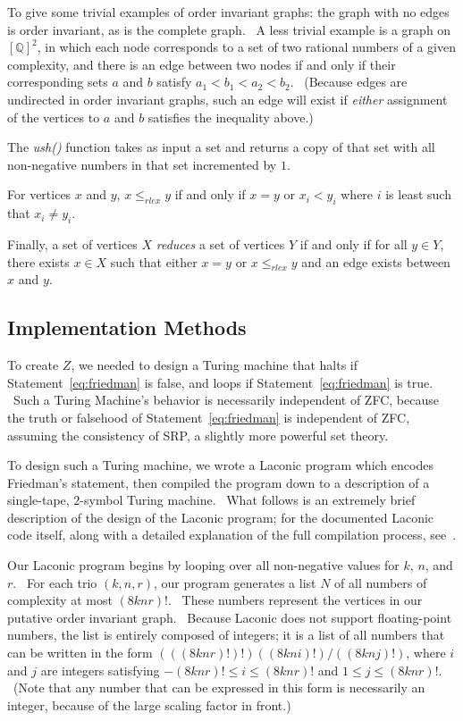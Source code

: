 \documentclass[11pt]{article}
\begin{document}
To give some trivial examples of order invariant graphs: the graph with no edges is order invariant, as is the complete graph. \ A less trivial example is a graph on $[\mathbb{Q}]^2$, in which each node corresponds to a set of two rational numbers of a given complexity, and there is an edge between two nodes if and only if their corresponding sets $a$ and $b$ satisfy $a_1 < b_1 < a_2 < b_2$. \ (Because edges are undirected in order invariant graphs, such an edge will exist if \emph{either} assignment of the vertices to $a$ and $b$ satisfies the inequality above.)

The \emph{ush()} function takes as input a set and returns a copy of that set with all non-negative numbers in that set incremented by $1$.

For vertices $x$ and $y$, $x \le_{rlex} y$ if and only if $x = y$ or $x_i < y_i$ where $i$ is least such that $x_i \not= y_i$.

Finally, a set of vertices $X$ \emph{reduces} a set of vertices $Y$ if and only if for all $y \in Y$, there exists $x \in X$ such that 
either $x = y$ or
$x \le_{rlex} y$ and an edge exists between $x$ and $y$.

\subsection{Implementation Methods}

To create $Z$, we needed to design a Turing machine that halts if Statement~\ref{eq:friedman} is false, and loops if Statement~\ref{eq:friedman} is true. \ Such a Turing Machine's behavior is necessarily independent of ZFC, because the truth or falsehood of Statement~\ref{eq:friedman} is independent of ZFC, assuming the consistency of SRP, a slightly more powerful set theory.~\cite{friedman}

To design such a Turing machine, we wrote a Laconic program which encodes Friedman's statement, then compiled the program down to a description of a single-tape, $2$-symbol Turing machine. \ What follows is an extremely brief description of the design of the Laconic program; for the documented Laconic code itself, along with a detailed explanation of the full compilation process, see~\cite{github}.

Our Laconic program begins by looping over all non-negative values for $k$, $n$, and $r$. \ For each trio $(k, n, r)$, our program generates a list $N$ of all numbers of complexity at most $(8knr)!$. \ These numbers represent the vertices in our putative order invariant graph. \ Because Laconic does not support floating-point numbers, the list is entirely composed of integers; it is a list of all numbers that can be written in the form $(((8knr)!)!)((8kni)!)/((8knj)!)$, where $i$ and $j$ are integers satisfying $-(8knr)! \le i \le (8knr)!$ and $1 \le j \le (8knr)!$. \ (Note that any number that can be expressed in this form is necessarily an integer, because of the large scaling factor in front.)
\end{document}

